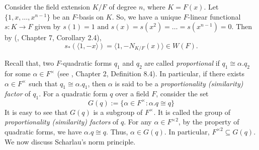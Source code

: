 \documentclass[sn-mathphys-num]{sn-jnl}%
\newtheorem{theorem}{Theorem}[section]
\begin{document}
Consider the field extension $K/F$ of degree $n$, where $K=F(x)$. Let $ \{1,x,\dots,x^{n-1} \}$ be an $F$-basis on $K$. So, we have a unique $F$-linear functional $s : K \to F$ given by    $s(1)=1\text{ and } s(x)=s(x^2)=\dots=s(x^{n-1})=0$. Then by (\cite{lam}, Chapter 7, Corollary 2.4), 
\begin{equation} \label{scharlau transfer}
    s_*(\langle 1,-x \rangle  ) =  \langle 1, -N_{K/F}(x) \rangle \in W(F).
\end{equation}




Recall that, two $F$-quadratic forms $q_1$ and $q_2$ are called {\it proportional} if $q_1 \cong \alpha. q_2$ for some $\alpha \in F^\times$ (see \cite{sch}, Chapter 2, Definition 8.4). In particular, if there exists $\alpha \in F^\times$ such that $q_1 \cong \alpha. q_1$, then $\alpha$ is said to be a {\it proportionality (similarity) factor} of $q_1$. For a quadratic form $q$ over a field $F$, consider the set
\[G(q):= \{ \alpha \in F^\times: \alpha.q \cong q\}\]
It is easy to see that $G(q)$ is a subgroup of $F^\times$. It is called the group of {\it proportionality (similarity) factors} of $q$. 
For any $\alpha \in F^{\times 2}$, by the property of quadratic forms, we have $\alpha.q \cong q$. Thus, $\alpha \in G(q)$. In particular, $F^{\times 2} \subseteq G(q)$. We now discuss Scharlau's norm principle.
\medskip
\end{document}
